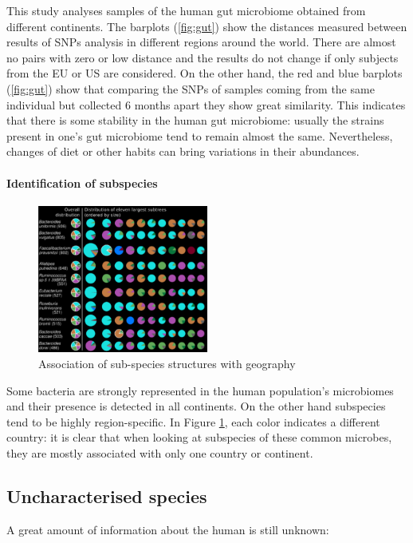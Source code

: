             This study analyses samples of the human gut microbiome obtained from different continents.
            The barplots (\ref{fig:gut}) show the distances measured between results of SNPs analysis in different regions around the world.
            There are almost no pairs with zero or low distance and the results do not change if only subjects from the EU or US are considered.
            On the other hand, the red and blue barplots (\ref{fig:gut}) show that comparing the SNPs of samples coming from the same individual but collected 6 months apart they show great similarity.
            This indicates that there is some stability in the human gut microbiome: usually the strains present in one’s gut microbiome tend to remain almost the same.
            Nevertheless, changes of diet or other habits can bring variations in their abundances.

            \paragraph{Identification of subspecies}

            \begin{figure}[!h]
            \centering
            \includegraphics[width=0.5\textwidth]{strainGeo.png}
            \caption{\label{fig:geo}Association of sub-species structures with geography}
            \end{figure}

            Some bacteria are strongly represented in the human population’s microbiomes and their presence is detected in all continents.
            On the other hand subspecies tend to be highly region-specific.
            In Figure \ref{fig:geo}, each color indicates a different country: it is clear that when looking at subspecies of these common microbes, they are mostly associated with only one country or continent.

    \subsection{Uncharacterised species}
    A great amount of information about the human is still unknown:

